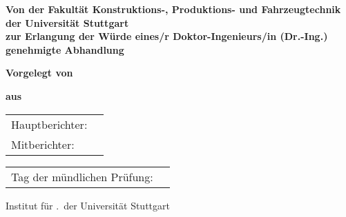 \ifpublishing
\begin{titlepage}
	\setcounter{page}{3} %
	\centering
	\large %
	
	
	\begin{Large}
		\textbf{\Titel}
	\end{Large}
	
	\vspace{2\baselineskip}
	
	\textbf{Von der Fakultät Konstruktions-, Produktions- und Fahrzeugtechnik\\der Universität Stuttgart\\zur Erlangung der Würde eines/r Doktor-Ingenieurs/in (Dr.-Ing.)\\genehmigte Abhandlung}
	
	\vspace{4\baselineskip}
	
	\textbf{Vorgelegt von}
	
	\vspace{0.8\baselineskip}
	
	\textbf{\Autor}

	\vspace{0.3\baselineskip}
	\textbf{aus \Geburtsort}
	

	\vspace{3\baselineskip}
	\begin{table}[H]
		\large
		\begin{tabular}{ll}
			\quad Hauptberichter: & \protect\Hauptberichter\\
			\quad Mitberichter: & \protect\Mitberichter\\
		\end{tabular}
	\end{table}
	\vspace{0.25\baselineskip}
	\begin{table}[H]
		\large
		\begin{tabular}{ll}
			\quad Tag der mündlichen Prüfung:  & \protect\Pruefungsdatum\\
		\end{tabular}
	\end{table}
	
	\vfill
	
	\begin{center}
		Institut für \Institut.\ der Universität Stuttgart
	\end{center}
		
	\Jahr	
\end{titlepage}


